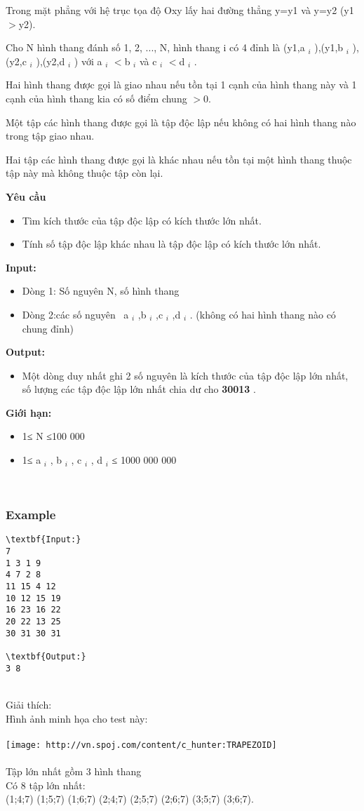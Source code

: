 

Trong mặt phẳng với hệ trục tọa độ Oxy lấy hai đường thẳng y=y1 và y=y2 (y1$>$y2).

Cho N hình thang đánh số 1, 2, ..., N, hình thang i có 4 đỉnh là (y1,a $_ i $ ),(y1,b $_ i $ ),(y2,c $_ i $ ),(y2,d $_ i $ ) với a $_ i $ $<$b $_ i $ và c $_ i $ $<$d $_ i $ .

Hai hình thang được gọi là giao nhau nếu tồn tại 1 cạnh của hình thang này và 1 cạnh của hình thang kia có số điểm chung $>$0.

Một tập các hình thang được gọi là tập độc lập nếu không có hai hình thang nào trong tập giao nhau.

Hai tập các hình thang được gọi là khác nhau nếu tồn tại một hình thang thuộc tập này mà không thuộc tập còn lại.

\textbf{Yêu cầu}
\begin{itemize}
	\item Tìm kích thước của tập độc lập có kích thước lớn nhất.
	\item Tính số tập độc lập khác nhau là tập độc lập có kích thước lớn nhất.
\end{itemize}

\textbf{Input: }
\begin{itemize}
	\item Dòng 1: Số nguyên N, số hình thang
	\item Dòng 2:các số nguyên  a $_ i $ ,b $_ i $ ,c $_ i $ ,d $_ i $ . (không có hai hình thang nào có chung đỉnh)
\end{itemize}

\textbf{Output: }
\begin{itemize}
	\item Một dòng duy nhất ghi 2 số nguyên là kích thước của tập độc lập lớn nhất, số lượng các tập độc lập lớn nhất chia dư cho \textbf{ 30013 } .
\end{itemize}

\textbf{Giới hạn: }
\begin{itemize}
	\item 1≤ N ≤100 000
	\item 1≤ a $_ i $ , b $_ i $ , c $_ i $ , d $_ i $ ≤ 1000 000 000
\end{itemize}

 

\subsubsection{Example}
\begin{verbatim}
\textbf{Input:}
7
1 3 1 9
4 7 2 8
11 15 4 12
10 12 15 19
16 23 16 22
20 22 13 25
30 31 30 31

\textbf{Output:}
3 8\end{verbatim}


\\Giải thích:
\\Hình ảnh minh họa cho test này:
\\
\\
\texttt{[image: http://vn.spoj.com/content/c\_hunter:TRAPEZOID]}
\\
\\Tập lớn nhất gồm 3 hình thang
\\Có 8 tập lớn nhất:
\\(1;4;7) (1;5;7) (1;6;7) (2;4;7) (2;5;7) (2;6;7) (3;5;7) (3;6;7).